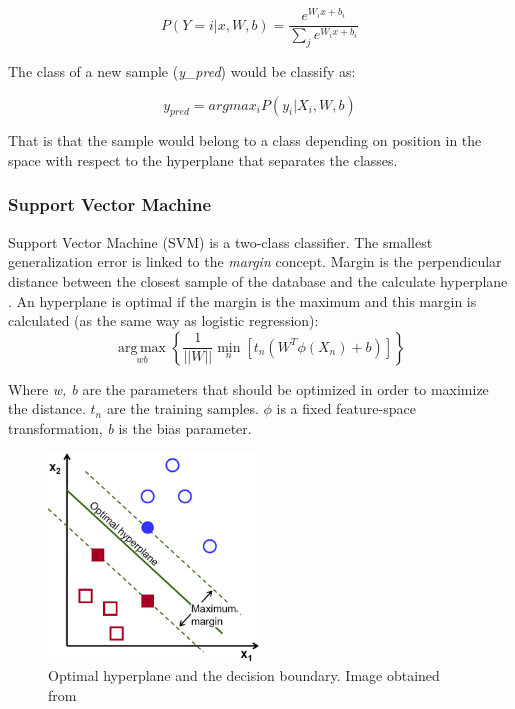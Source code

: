 \begin{equation}
P(Y=i|x,W,b) = \frac{e^{W_ix+b_i}}{\sum_j e^{W_ix+b_i}}
\end{equation}

The class of a new sample (\textit{y\_{pred}}) would be classify as:

\begin{equation}
y_{pred} = argmax_{i}P(y_i|X_i,W,b)
\end{equation}

That is that the sample would belong to a class depending on position in the space with respect to the hyperplane that separates the classes.\\

\subsubsection{Support Vector Machine}
Support Vector Machine (SVM) is a two-class classifier. The smallest generalization error is linked to the \textit{margin} concept. Margin is the perpendicular distance between the closest sample of the database and the calculate hyperplane \cite{MachineLearning}. An hyperplane is optimal if the margin is the maximum and this margin is calculated (as the same way as logistic regression):\\

\begin{equation}
\underset{w b}{\operatorname{arg\,max}}\left \{ \frac{1}{||W||} \underset{n}{\operatorname{min}}[t_{n}(W^T \phi (X_n)+b)]   \right \}
\end{equation}


Where \textit{w, b} are the parameters that should be optimized in order to maximize the distance. \textit{$t_n$} are the training samples. $\phi$ is a fixed feature-space transformation, \textit{b} is the bias parameter.\\

\begin{figure}[htb]
\centering
\includegraphics[width=0.5\textwidth]{images_miscelaneus/svm.png}
\caption{Optimal hyperplane and the decision boundary. Image obtained from \cite{SVMimage}} \label{fig:SVM}
\end{figure}


